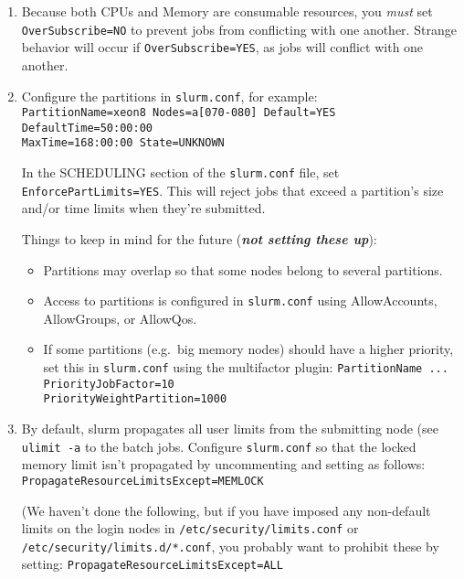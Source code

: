 \begin{enumerate}
\begin{enumerate}
\begin{enumerate}
		\item Because both CPUs and Memory are consumable resources, you \emph{must} set \texttt{OverSubscribe=NO} to prevent jobs from conflicting with one another. Strange behavior will occur if \texttt{OverSubscribe=YES}, as jobs will conflict with one another. %

		\item Configure the partitions in \texttt{slurm.conf}, for example: \\
		\texttt{PartitionName=xeon8 Nodes=a[070-080] Default=YES DefaultTime=50:00:00 \\ MaxTime=168:00:00 State=UNKNOWN}

		In the SCHEDULING section of the \texttt{slurm.conf} file, set \texttt{EnforcePartLimits=YES}. This will reject jobs that exceed a partition's size and/or time limits when they're submitted.

		Things to keep in mind for the future (\emph{\textbf{not setting these up}}):
			\begin{itemize}
			\item Partitions may overlap so that some nodes belong to several partitions. 
	
			\item Access to partitions is configured in \texttt{slurm.conf} using AllowAccounts, AllowGroups, or AllowQos.
	
			\item If some partitions (e.g.\ big memory nodes) should have a higher priority, set this in \texttt{slurm.conf} using the multifactor plugin:
			\texttt{PartitionName ... PriorityJobFactor=10} \\
			\texttt{PriorityWeightPartition=1000}
			\end{itemize}

		\item By default, slurm propagates all user limits from the submitting node (see \texttt{ulimit -a} to the batch jobs. Configure \texttt{slurm.conf} so that the locked memory limit isn't propagated by uncommenting and setting as follows: \\
		\texttt{PropagateResourceLimitsExcept=MEMLOCK}
	
		(We haven't done the following, but if you have imposed any non-default limits on the login nodes in \texttt{/etc/security/limits.conf} or \texttt{/etc/security/limits.d/*.conf}, you probably want to prohibit these by setting: 
		\texttt{PropagateResourceLimitsExcept=ALL}
	

\end{enumerate}
\end{enumerate}
\end{enumerate}
